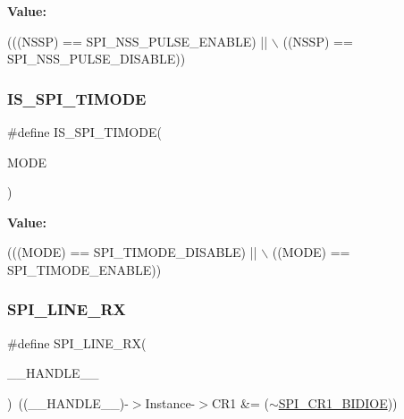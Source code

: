{\bfseries Value\+:}
\begin{DoxyCode}
(((NSSP) == SPI\_NSS\_PULSE\_ENABLE) || \(\backslash\)
                           ((NSSP) == SPI\_NSS\_PULSE\_DISABLE))
\end{DoxyCode}
\mbox{\label{group___s_p_i___private___macros_ga812f7bf5919bc6e45727d6ac05c60b49}} 
\subsubsection{\texorpdfstring{I\+S\+\_\+\+S\+P\+I\+\_\+\+T\+I\+M\+O\+DE}{IS\_SPI\_TIMODE}}
{\footnotesize\ttfamily \#define I\+S\+\_\+\+S\+P\+I\+\_\+\+T\+I\+M\+O\+DE(\begin{DoxyParamCaption}\item[{}]{M\+O\+DE }\end{DoxyParamCaption})}

{\bfseries Value\+:}
\begin{DoxyCode}
(((MODE) == SPI\_TIMODE\_DISABLE) || \(\backslash\)
                             ((MODE) == SPI\_TIMODE\_ENABLE))
\end{DoxyCode}
\mbox{\label{group___s_p_i___private___macros_gaa8d58cef91c1874d5a4dde4014cf6269}} 
\subsubsection{\texorpdfstring{S\+P\+I\+\_\+L\+I\+N\+E\+\_\+\+RX}{SPI\_1LINE\_RX}}
{\footnotesize\ttfamily \#define S\+P\+I\+\_\+L\+I\+N\+E\+\_\+\+RX(\begin{DoxyParamCaption}\item[{}]{\+\_\+\+\_\+\+H\+A\+N\+D\+L\+E\+\_\+\+\_\+ }\end{DoxyParamCaption})~((\+\_\+\+\_\+\+H\+A\+N\+D\+L\+E\+\_\+\+\_\+)-\/$>$Instance-\/$>$C\+R1 \&= ($\sim$\hyperlink{group___peripheral___registers___bits___definition_ga378953916b7701bd49f063c0366b703f}{S\+P\+I\+\_\+\+C\+R1\+\_\+\+B\+I\+D\+I\+OE}))}



